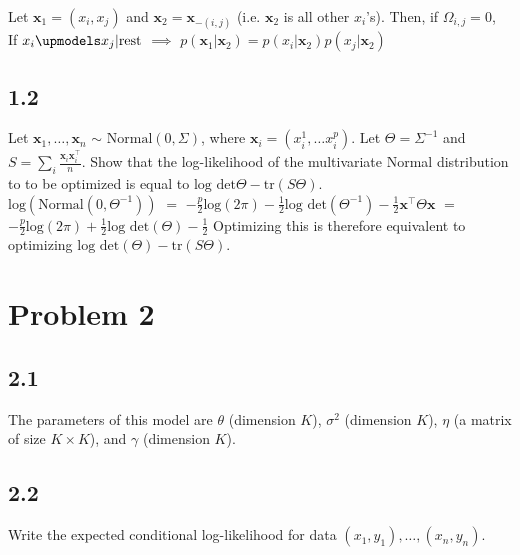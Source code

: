 \documentclass[12pt]{article}
\begin{document}
Let $\textbf{x}_1 = (x_i,x_j)$ and $\textbf{x}_2 = \textbf{x}_{-(i,j)}$ (i.e. $\textbf{x}_2$ is all other $x_i$'s). Then, if $\Omega_{i,j} = 0$, 
\\

If $x_i \upmodels x_j | \text{rest}$ $\implies$ $p(\textbf{x}_1 | \textbf{x}_2) = p(x_i | \textbf{x}_2) p(x_j | \textbf{x}_2)$


\subsection*{1.2}
Let $\textbf{x}_1, \ldots, \textbf{x}_n$ $\sim$ $\text{Normal}(0,\Sigma)$, where $\textbf{x}_i = (x_i^1, \ldots x_i^p)$. Let $\Theta = \Sigma^{-1}$ and $S = \sum_i \frac{\textbf{x}_i \textbf{x}_i^\top}{n}$. Show that the log-likelihood of the multivariate Normal distribution to to be optimized is equal to $\text{log} \text{ det} \Theta - \text{tr}(S\Theta)$.
\\


$\text{log}(\text{Normal}(0,\Theta^{-1}))$ $=$ 
$-\frac{p}{2}\text{log}(2\pi) - \frac{1}{2} \text{log} \text{ det}(\Theta^{-1}) - \frac{1}{2}\textbf{x}^{\top} \Theta \textbf{x}$ 
$=$ 
$-\frac{p}{2}\text{log}(2\pi) + \frac{1}{2} \text{log} \text{ det}(\Theta) - \frac{1}{2}$
Optimizing this is therefore equivalent to optimizing $\text{log} \text{ det}(\Theta) - \text{tr}(S\Theta)$.


\section*{Problem 2}
\label{sec:prob2}

\subsection*{2.1}
The parameters of this model are $\theta$ (dimension $K$), $\sigma^2$ (dimension $K$), $\eta$ (a matrix of size $K \times K$), and $\gamma$ (dimension $K$).

\subsection*{2.2}
Write the expected conditional log-likelihood for data $(x_1,y_1),\ldots,(x_n,y_n)$.
\\
\end{document}
